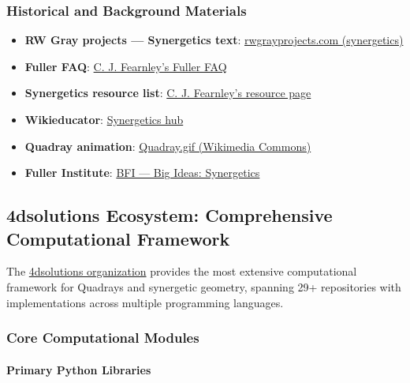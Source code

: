 \documentclass[
  10pt,
]{article}
\providecommand{\tightlist}{%
  \setlength{\itemsep}{0pt}\setlength{\parskip}{0pt}}
\begin{document}
\hypertarget{historical-and-background-materials}{%
\subsubsection{Historical and Background
Materials}\label{historical-and-background-materials}}

\begin{itemize}
\tightlist
\item
  \textbf{RW Gray projects --- Synergetics text}:
  \href{http://www.rwgrayprojects.com/synergetics/s00/p0000.html}{rwgrayprojects.com
  (synergetics)}
\item
  \textbf{Fuller FAQ}:
  \href{https://www.cjfearnley.com/fuller-faq.pdf}{C. J. Fearnley's
  Fuller FAQ}
\item
  \textbf{Synergetics resource list}:
  \href{https://www.cjfearnley.com/fuller-faq-2.html}{C. J. Fearnley's
  resource page}
\item
  \textbf{Wikieducator}:
  \href{https://wikieducator.org/Synergetics}{Synergetics hub}
\item
  \textbf{Quadray animation}:
  \href{https://commons.wikimedia.org/wiki/File:Quadray.gif}{Quadray.gif
  (Wikimedia Commons)}
\item
  \textbf{Fuller Institute}:
  \href{https://www.bfi.org/about-fuller/big-ideas/synergetics/}{BFI ---
  Big Ideas: Synergetics}
\end{itemize}

\hypertarget{dsolutions-ecosystem-comprehensive-computational-framework}{%
\subsection{4dsolutions Ecosystem: Comprehensive Computational
Framework}\label{dsolutions-ecosystem-comprehensive-computational-framework}}

The \href{https://github.com/4dsolutions}{4dsolutions organization}
provides the most extensive computational framework for Quadrays and
synergetic geometry, spanning 29+ repositories with implementations
across multiple programming languages.

\hypertarget{core-computational-modules}{%
\subsubsection{Core Computational
Modules}\label{core-computational-modules}}

\hypertarget{primary-python-libraries}{%
\paragraph{Primary Python Libraries}\label{primary-python-libraries}}
\end{document}
